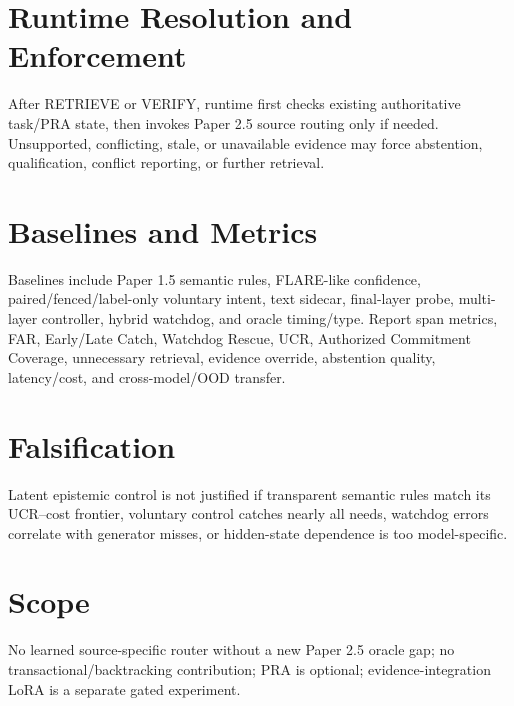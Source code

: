 \documentclass[10pt]{article}
\begin{document}
\section{Runtime Resolution and Enforcement}
After RETRIEVE or VERIFY, runtime first checks existing authoritative task/PRA state, then invokes Paper 2.5 source routing only if needed. Unsupported, conflicting, stale, or unavailable evidence may force abstention, qualification, conflict reporting, or further retrieval.
\section{Baselines and Metrics}
Baselines include Paper 1.5 semantic rules, FLARE-like confidence, paired/fenced/label-only voluntary intent, text sidecar, final-layer probe, multi-layer controller, hybrid watchdog, and oracle timing/type. Report span metrics, FAR, Early/Late Catch, Watchdog Rescue, UCR, Authorized Commitment Coverage, unnecessary retrieval, evidence override, abstention quality, latency/cost, and cross-model/OOD transfer.
\section{Falsification}
Latent epistemic control is not justified if transparent semantic rules match its UCR--cost frontier, voluntary control catches nearly all needs, watchdog errors correlate with generator misses, or hidden-state dependence is too model-specific.
\section{Scope}
No learned source-specific router without a new Paper 2.5 oracle gap; no transactional/backtracking contribution; PRA is optional; evidence-integration LoRA is a separate gated experiment.
\end{document}
